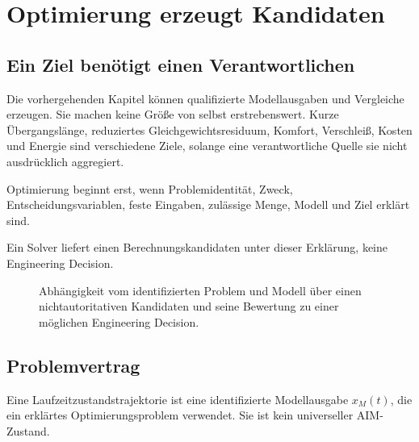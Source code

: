 \chapter{Optimierung erzeugt Kandidaten}
\label{chap:optimization-in-state-space}

\section*{Ein Ziel benötigt einen Verantwortlichen}

Die vorhergehenden Kapitel können qualifizierte Modellausgaben und Vergleiche
erzeugen. Sie machen keine Größe von selbst erstrebenswert. Kurze
Übergangslänge, reduziertes Gleichgewichtsresiduum, Komfort, Verschleiß,
Kosten und Energie sind verschiedene Ziele, solange eine verantwortliche
Quelle sie nicht ausdrücklich aggregiert.

\begin{principle}
\label{princ:state-space-optimization}
Optimierung beginnt erst, wenn Problemidentität, Zweck,
Entscheidungsvariablen, feste Eingaben, zulässige Menge, Modell und Ziel
erklärt sind.
\end{principle}

\begin{principle}[Kandidatenprinzip]
\label{princ:trajectory-shaping}
Ein Solver liefert einen Berechnungskandidaten unter dieser Erklärung, keine
Engineering Decision.
\end{principle}

\begin{figure}[htbp]
\centering

\caption{Abhängigkeit vom identifizierten Problem und Modell über einen nichtautoritativen Kandidaten und seine Bewertung zu einer möglichen Engineering Decision.}
\label{fig:model-candidate-decision}
\end{figure}

\section{Problemvertrag}

\begin{definition}[Laufzeitzustandstrajektorie]
\label{def:runtime-state-trajectory}
Eine Laufzeitzustandstrajektorie ist eine identifizierte Modellausgabe
\(x_M(t)\), die ein erklärtes Optimierungsproblem verwendet. Sie ist kein
universeller AIM-Zustand.
\end{definition}

